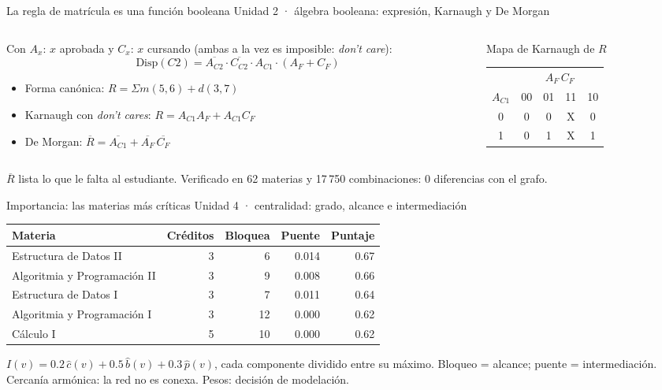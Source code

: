 \documentclass[aspectratio=169,14pt]{beamer}
\newcommand{\unidad}[1]{{\footnotesize\color{gris}#1}\par\vspace{2mm}}
\begin{document}
\begin{frame}{La regla de matrícula es una función booleana}
\unidad{Unidad 2 · álgebra booleana: expresión, Karnaugh y De Morgan}
\begin{columns}[T]
\begin{column}{0.58\textwidth}
\footnotesize
Con $A_x$: $x$ aprobada y $C_x$: $x$ cursando (ambas a la vez es imposible: \emph{don't care}):
\[ \mathrm{Disp}(C2)=\overline{A_{C2}}\cdot\overline{C_{C2}}\cdot A_{C1}\cdot(A_F+C_F) \]
\begin{itemize}
\item Forma canónica: $R=\Sigma m(5,6)+d(3,7)$
\item Karnaugh con \emph{don't cares}: $R=A_{C1}A_F+A_{C1}C_F$
\item De Morgan: $\overline R=\overline{A_{C1}}+\overline{A_F}\,\overline{C_F}$
\end{itemize}
\end{column}
\begin{column}{0.38\textwidth}
\centering\small Mapa de Karnaugh de $R$\\[2mm]
\begin{tabular}{c|cccc}
 & \multicolumn{4}{c}{$A_F\,C_F$}\\
$A_{C1}$ & 00 & 01 & 11 & 10\\\hline
0 & 0 & 0 & X & 0\\
1 & 0 & \cellcolor{azul!25}1 & \cellcolor{azul!25}X & \cellcolor{azul!25}1\\
\end{tabular}
\end{column}
\end{columns}
\vfill
{\scriptsize\color{gris}$\overline R$ lista lo que le falta al estudiante. Verificado en 62 materias y 17\,750 combinaciones: 0 diferencias con el grafo.}
\end{frame}

\begin{frame}{Importancia: las materias más críticas}
\unidad{Unidad 4 · centralidad: grado, alcance e intermediación}
\centering\small
\begin{tabular}{lrrrr}
\toprule
Materia & Créditos & Bloquea & Puente & Puntaje\\
\midrule
Estructura de Datos II & 3 & 6 & 0.014 & 0.67\\
Algoritmia y Programación II & 3 & 9 & 0.008 & 0.66\\
Estructura de Datos I & 3 & 7 & 0.011 & 0.64\\
Algoritmia y Programación I & 3 & 12 & 0.000 & 0.62\\
Cálculo I & 5 & 10 & 0.000 & 0.62\\
\bottomrule
\end{tabular}

\vspace{2mm}
$I(v)=0.2\,\hat c(v)+0.5\,\hat b(v)+0.3\,\hat p(v)$, cada componente dividido entre su máximo.
\vfill
{\scriptsize\color{gris}Bloqueo = alcance; puente = intermediación. Cercanía armónica: la red no es conexa. Pesos: decisión de modelación.}
\end{frame}
\end{document}

